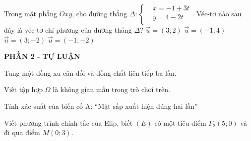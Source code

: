 \begin{ex}%
Trong mặt phẳng $Oxy$, cho đường thẳng $\Delta \colon \left\{\begin{aligned}
& x=-1+3t\\ & y=4-2t\\ \end{aligned}\right.$. Véc-tơ nào sau đây là véc-tơ chỉ phương của đường thẳng $\Delta$?
\choice
{$\overrightarrow{u}=(3;2)$}
{$\overrightarrow{u}=(-1;4)$}
{\True $\overrightarrow{u}=(3;-2)$}
{$\overrightarrow{u}=(-1;-2)$}
\end{ex}

\begin{center}
	\textbf{PHẦN 2 - TỰ LUẬN}
\end{center}

\begin{bt}%
	Tung một đồng xu cân đối và đồng chất liên tiếp ba lần.
	\begin{enumEX}{1}
		\item Viết tập hợp $\Omega $ là không gian mẫu trong trò chơi trên.
		\item Tính xác suất của biến cố A: “Mặt sấp xuất hiện đúng hai lần”
	\end{enumEX}
\end{bt}

\begin{bt}%
	Viết phương trình chính tắc của Elip, biết $(E)$ có một tiêu điểm $F_2(5;0)$ và đi qua điểm $M(0;3)$.
\end{bt}

